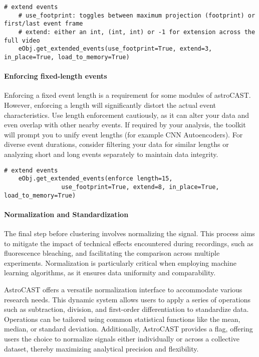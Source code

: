 \begin{lstlisting}[style=pyStyle]
    # extend events
    # use_footprint: toggles between maximum projection (footprint) or first/last event frame
    # extend: either an int, (int, int) or -1 for extension across the full video
    eObj.get_extended_events(use_footprint=True, extend=3, in_place=True, load_to_memory=True)
\end{lstlisting}

\paragraph{Enforcing fixed-length events}
\label{par:enforcing-length}
Enforcing a fixed event length is a requirement for some modules of astroCAST. However, enforcing a length will significantly distort the actual event characteristics. Use length enforcement cautiously, as it can alter your data and even overlap with other nearby events. If required by your analysis, the toolkit will prompt you to unify event lengths (for example \ac{CNN} Autoencoders). For diverse event durations, consider filtering your data for similar lengths or analyzing short and long events separately to maintain data integrity.

\begin{lstlisting}[style=pyStyle]
    # extend events
    eObj.get_extended_events(enforce length=15,
                use_footprint=True, extend=8, in_place=True, load_to_memory=True)
\end{lstlisting}

\paragraph{Normalization and Standardization}
The final step before clustering involves normalizing the signal. This process aims to mitigate the impact of technical effects encountered during recordings, such as fluorescence bleaching, and facilitating the comparison across multiple experiments. Normalization is particularly critical when employing machine learning algorithms, as it ensures data uniformity and comparability.

AstroCAST offers a versatile normalization interface to accommodate various research needs. This dynamic system allows users to apply a series of operations such as subtraction, division, and first-order differentiation to standardize data. Operations can be tailored using common statistical functions like the mean, median, or standard deviation. Additionally, AstroCAST provides a  flag, offering users the choice to normalize signals either individually or across a collective dataset, thereby maximizing analytical precision and flexibility.

